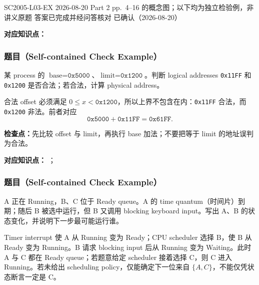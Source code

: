 

\examplemeta
  {SC2005-L03-EX}
  {2026-08-20}
  {Part 2 pp.~4--16 的概念图；以下均为独立检验例，非讲义原题}
  {答案已完成并经问答核对}
  {已确认（2026-08-20）}


\textbf{对应知识点：}

\subsubsection*{题目（Self-contained Check Example）}

某 process 的 $\text{base}=\texttt{0x5000}$、$\text{limit}=\texttt{0x1200}$。判断 logical addresses \texttt{0x11FF} 和 \texttt{0x1200} 是否合法；若合法，计算 physical address。

\begin{checkedsolution}
合法 offset 必须满足 $0\leq x<\texttt{0x1200}$，所以上界不包含在内：\texttt{0x11FF} 合法，而 \texttt{0x1200} 非法。前者对应
\[
  \texttt{0x5000}+\texttt{0x11FF}=\boxed{\texttt{0x61FF}}.
\]
\end{checkedsolution}

\textbf{检查点：}先比较 offset 与 limit，再执行 base 加法；不要把等于 limit 的地址误判为合法。


\textbf{对应知识点：}
；

\subsubsection*{题目（Self-contained Check Example）}

A 正在 Running，B、C 位于 Ready queue。A 的 time quantum（时间片）到期；随后 B 被选中运行，但 B 又调用 blocking keyboard input。写出 A、B 的状态变化，并说明下一步最可能运行谁。

\begin{checkedsolution}
Timer interrupt 使 A 从 Running 变为 Ready；CPU scheduler 选择 B，使 B 从 Ready 变为 Running。B 请求 blocking input 后从 Running 变为 Waiting。此时 A 与 C 都在 Ready queue；若题意给定 scheduler 接着选择 C，则 C 进入 Running。若未给出 scheduling policy，仅能确定下一位来自 $\{A,C\}$，不能仅凭状态断言一定是 C。
\end{checkedsolution}

